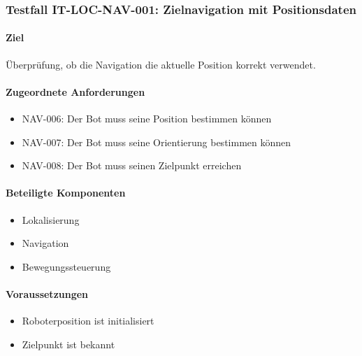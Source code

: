 \documentclass[
  a4paper,
  12pt,
  DIV=12,        %
  parskip=half,  %
  headings=small %
]{scrartcl}
\theoremstyle{definition}
\providecommand{\tightlist}{%
  \setlength{\itemsep}{0pt}\setlength{\parskip}{0pt}}
\theoremstyle{definition}
\begin{document}
\subsubsection{Testfall IT-LOC-NAV-001: Zielnavigation mit
Positionsdaten}\label{testfall-it-loc-nav-001-zielnavigation-mit-positionsdaten}

\paragraph{Ziel}\label{ziel-10}

Überprüfung, ob die Navigation die aktuelle Position korrekt verwendet.

\paragraph{Zugeordnete
Anforderungen}\label{zugeordnete-anforderungen-10}

\begin{itemize}
\tightlist
\item
  NAV-006: Der Bot muss seine Position bestimmen können
\item
  NAV-007: Der Bot muss seine Orientierung bestimmen können
\item
  NAV-008: Der Bot muss seinen Zielpunkt erreichen
\end{itemize}

\paragraph{Beteiligte Komponenten}\label{beteiligte-komponenten-1}

\begin{itemize}
\tightlist
\item
  Lokalisierung
\item
  Navigation
\item
  Bewegungssteuerung
\end{itemize}

\paragraph{Voraussetzungen}\label{voraussetzungen-10}

\begin{itemize}
\tightlist
\item
  Roboterposition ist initialisiert
\item
  Zielpunkt ist bekannt
\end{itemize}
\end{document}
